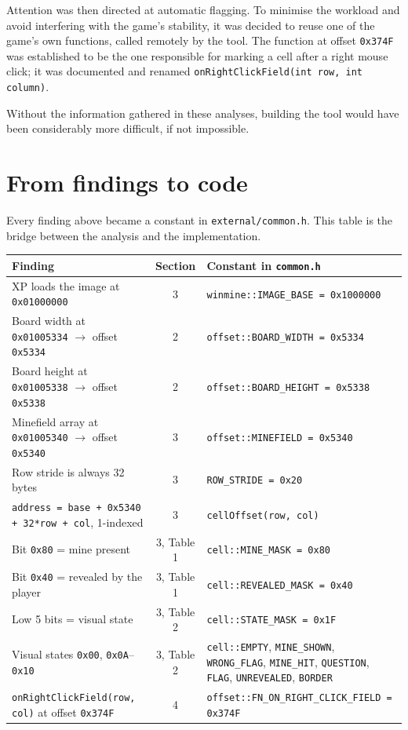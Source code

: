 \documentclass[11pt,a4paper]{article}
\begin{document}
Attention was then directed at automatic flagging. To minimise the workload and avoid
interfering with the game's stability, it was decided to reuse one of the game's own functions,
called remotely by the tool. The function at offset \texttt{0x374F} was established to be the
one responsible for marking a cell after a right mouse click; it was documented and renamed
\texttt{onRightClickField(int row, int column)}.

Without the information gathered in these analyses, building the tool would have been
considerably more difficult, if not impossible.


\section{From findings to code}

Every finding above became a constant in \texttt{external/common.h}. This table is the bridge
between the analysis and the implementation.

\begin{longtable}{|>{\raggedright\arraybackslash}p{}|c|>{\raggedright\arraybackslash}p{}|}
\hline
\textbf{Finding} & \textbf{Section} & \textbf{Constant in \texttt{common.h}} \\
\hline
\endhead
XP loads the image at \texttt{0x01000000} & 3 & \texttt{winmine::IMAGE\_BASE = 0x1000000} \\
\hline
Board width at \texttt{0x01005334} $\rightarrow$ offset \texttt{0x5334} & 2 & \texttt{offset::BOARD\_WIDTH = 0x5334} \\
\hline
Board height at \texttt{0x01005338} $\rightarrow$ offset \texttt{0x5338} & 2 & \texttt{offset::BOARD\_HEIGHT = 0x5338} \\
\hline
Minefield array at \texttt{0x01005340} $\rightarrow$ offset \texttt{0x5340} & 3 & \texttt{offset::MINEFIELD = 0x5340} \\
\hline
Row stride is always 32 bytes & 3 & \texttt{ROW\_STRIDE = 0x20} \\
\hline
\texttt{address = base + 0x5340 + 32*row + col}, 1-indexed & 3 & \texttt{cellOffset(row, col)} \\
\hline
Bit \texttt{0x80} = mine present & 3, Table 1 & \texttt{cell::MINE\_MASK = 0x80} \\
\hline
Bit \texttt{0x40} = revealed by the player & 3, Table 1 & \texttt{cell::REVEALED\_MASK = 0x40} \\
\hline
Low 5 bits = visual state & 3, Table 2 & \texttt{cell::STATE\_MASK = 0x1F} \\
\hline
Visual states \texttt{0x00}, \texttt{0x0A}--\texttt{0x10} & 3, Table 2 & \texttt{cell::EMPTY}, \texttt{MINE\_SHOWN}, \texttt{WRONG\_FLAG}, \texttt{MINE\_HIT}, \texttt{QUESTION}, \texttt{FLAG}, \texttt{UNREVEALED}, \texttt{BORDER} \\
\hline
\texttt{onRightClickField(row, col)} at offset \texttt{0x374F} & 4 & \texttt{offset::FN\_ON\_RIGHT\_CLICK\_FIELD = 0x374F} \\
\hline
\end{longtable}
\end{document}
